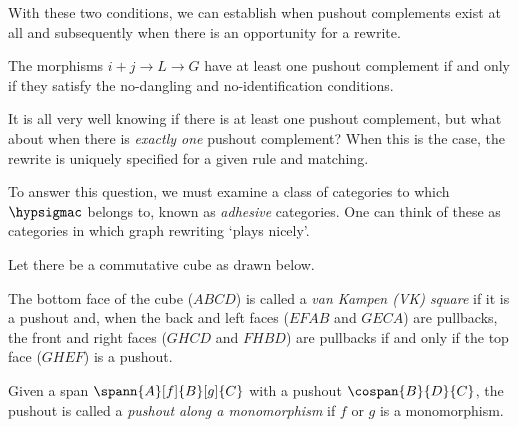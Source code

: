 With these two conditions, we can establish when pushout complements exist at
all and subsequently when there is an opportunity for a rewrite.

\begin{proposition}
    \label{prop:pushout-complement}
    The morphisms \(i+j \to L \to G\) have at least one pushout
    complement if and only if they satisfy the no-dangling and no-identification
    conditions.
\end{proposition}

It is all very well knowing if there is at least one pushout complement, but
what about when there is \emph{exactly one} pushout complement?
When this is the case, the rewrite is uniquely specified for a given rule and
matching.

To answer this question, we must examine a class of categories to which
\(\hypsigmac\) belongs to, known as \emph{adhesive} categories.
One can think of these as categories in which graph rewriting `plays nicely'.

\begin{definition}
    Let there be a commutative cube as drawn below.
    \begin{center}
    \end{center}
    The bottom face of the cube (\(ABCD\)) is called a
    \emph{van Kampen (VK) square} if it is a pushout and, when the back and
    left faces (\(EFAB\) and \(GECA\)) are pullbacks, the front and right faces
    (\(GHCD\) and \(FHBD\)) are pullbacks if and only if the top face (\(GHEF\))
    is a pushout.
\end{definition}

\begin{definition}
    Given a span \(\spann{A}[f]{B}[g]{C}\) with a pushout \(\cospan{B}{D}{C}\),
    the pushout is called a \emph{pushout along a monomorphism} if \(f\) or
    \(g\) is a monomorphism.
\end{definition}

